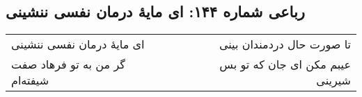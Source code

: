 \begin{center}
\section*{رباعی شماره ۱۴۴: ای مایهٔ درمان نفسی ننشینی}
\label{sec:144}
\begin{longtable}{l p{0.5cm} r}
ای مایهٔ درمان نفسی ننشینی
&&
تا صورت حال دردمندان بینی
\\
گر من به تو فرهاد صفت شیفته‌ام
&&
عیبم مکن ای جان که تو بس شیرینی
\\
\end{longtable}
\end{center}
